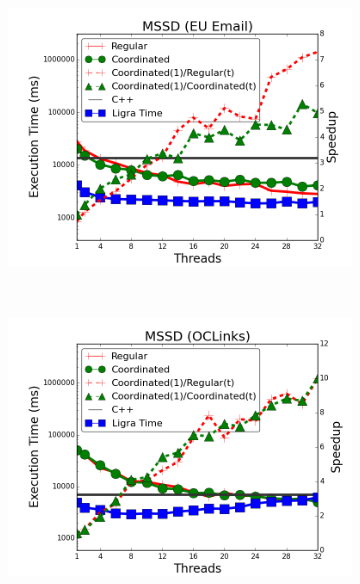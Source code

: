 \begin{figure}[]
        \centering
        \begin{subfigure}[b]{\plotsize\textwidth}
                \includegraphics[width=\textwidth]{experiments/coordination/cmp-shortest-email.png}
                \label{fig:coordination:coord_sssp_email}
        \end{subfigure}
        ~
        \begin{subfigure}[b]{\plotsize\textwidth}
                \includegraphics[width=\textwidth]{experiments/coordination/cmp-shortest-oclinks.png}
                \label{fig:coordination:coord_sssp_oclinks}

\end{subfigure}
\end{figure}
